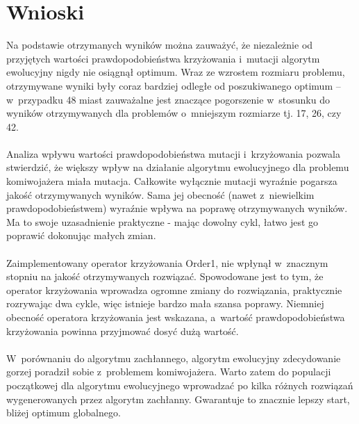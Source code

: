 \documentclass[12pt, a4paper]{article}
\begin{document}
\section{Wnioski}

Na podstawie otrzymanych wyników można zauważyć, że niezależnie od przyjętych wartości 
prawdopodobieństwa krzyżowania i~mutacji algorytm ewolucyjny nigdy nie osiągnął optimum.
 Wraz ze wzrostem rozmiaru problemu, otrzymywane wyniki były coraz bardziej odległe od 
poszukiwanego optimum -- w~przypadku 48 miast zauważalne jest znaczące pogorszenie w~stosunku 
do wyników otrzymywanych dla problemów o~mniejszym rozmiarze tj. 17, 26, czy 42.\\
\\
Analiza wpływu wartości prawdopodobieństwa mutacji i~krzyżowania pozwala stwierdzić, 
że większy wpływ na działanie algorytmu ewolucyjnego dla problemu komiwojażera miała mutacja. 
Całkowite wyłącznie mutacji wyraźnie pogarsza jakość otrzymywanych wyników. 
Sama jej obecność (nawet z~niewielkim prawdopodobieństwem) wyraźnie wpływa na poprawę 
otrzymywanych wyników. Ma to swoje uzasadnienie praktyczne - mając dowolny cykl, łatwo
jest go poprawić dokonując małych zmian.\\
\\
Zaimplementowany operator krzyżowania Order1, nie wpłynął w~znacznym 
stopniu na jakość otrzymywanych rozwiązać. Spowodowane jest to tym, że
operator krzyżowania wprowadza ogromne zmiany do rozwiązania, praktycznie rozrywając dwa cykle, 
więc istnieje bardzo mała szansa poprawy. Niemniej obecność operatora krzyżowania jest wskazana, 
a~wartość prawdopodobieństwa krzyżowania powinna przyjmować dosyć dużą wartość.\\
\\
W~porównaniu do algorytmu zachłannego, algorytm ewolucyjny zdecydowanie gorzej poradził sobie 
z~problemem komiwojażera. Warto zatem do populacji początkowej dla algorytmu ewolucyjnego
wprowadzać po kilka różnych rozwiązań wygenerowanych przez algorytm zachłanny. Gwarantuje to znacznie lepszy
start, bliżej optimum globalnego. 

\nocite{*}


\end{document}
